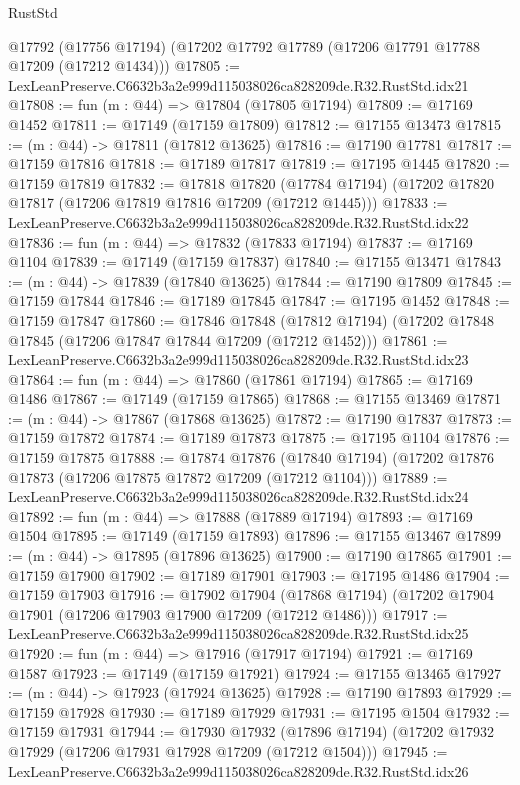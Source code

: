 \begin{lexlean}{RustStd}
\begin{coremodule}
    @17792
    (@17756 @17194)
    (@17202 @17792 @17789 (@17206 @17791 @17788 @17209 (@17212 @1434)))
@17805 := LexLeanPreserve.C6632b3a2e999d115038026ca828209de.R32.RustStd.idx21
@17808 := fun (m : @44) => @17804 (@17805 @17194)
@17809 := @17169 @1452
@17811 := @17149 (@17159 @17809)
@17812 := @17155 @13473
@17815 := (m : @44) -> @17811 (@17812 @13625)
@17816 := @17190 @17781
@17817 := @17159 @17816
@17818 := @17189 @17817
@17819 := @17195 @1445
@17820 := @17159 @17819
@17832 := @17818
    @17820
    (@17784 @17194)
    (@17202 @17820 @17817 (@17206 @17819 @17816 @17209 (@17212 @1445)))
@17833 := LexLeanPreserve.C6632b3a2e999d115038026ca828209de.R32.RustStd.idx22
@17836 := fun (m : @44) => @17832 (@17833 @17194)
@17837 := @17169 @1104
@17839 := @17149 (@17159 @17837)
@17840 := @17155 @13471
@17843 := (m : @44) -> @17839 (@17840 @13625)
@17844 := @17190 @17809
@17845 := @17159 @17844
@17846 := @17189 @17845
@17847 := @17195 @1452
@17848 := @17159 @17847
@17860 := @17846
    @17848
    (@17812 @17194)
    (@17202 @17848 @17845 (@17206 @17847 @17844 @17209 (@17212 @1452)))
@17861 := LexLeanPreserve.C6632b3a2e999d115038026ca828209de.R32.RustStd.idx23
@17864 := fun (m : @44) => @17860 (@17861 @17194)
@17865 := @17169 @1486
@17867 := @17149 (@17159 @17865)
@17868 := @17155 @13469
@17871 := (m : @44) -> @17867 (@17868 @13625)
@17872 := @17190 @17837
@17873 := @17159 @17872
@17874 := @17189 @17873
@17875 := @17195 @1104
@17876 := @17159 @17875
@17888 := @17874
    @17876
    (@17840 @17194)
    (@17202 @17876 @17873 (@17206 @17875 @17872 @17209 (@17212 @1104)))
@17889 := LexLeanPreserve.C6632b3a2e999d115038026ca828209de.R32.RustStd.idx24
@17892 := fun (m : @44) => @17888 (@17889 @17194)
@17893 := @17169 @1504
@17895 := @17149 (@17159 @17893)
@17896 := @17155 @13467
@17899 := (m : @44) -> @17895 (@17896 @13625)
@17900 := @17190 @17865
@17901 := @17159 @17900
@17902 := @17189 @17901
@17903 := @17195 @1486
@17904 := @17159 @17903
@17916 := @17902
    @17904
    (@17868 @17194)
    (@17202 @17904 @17901 (@17206 @17903 @17900 @17209 (@17212 @1486)))
@17917 := LexLeanPreserve.C6632b3a2e999d115038026ca828209de.R32.RustStd.idx25
@17920 := fun (m : @44) => @17916 (@17917 @17194)
@17921 := @17169 @1587
@17923 := @17149 (@17159 @17921)
@17924 := @17155 @13465
@17927 := (m : @44) -> @17923 (@17924 @13625)
@17928 := @17190 @17893
@17929 := @17159 @17928
@17930 := @17189 @17929
@17931 := @17195 @1504
@17932 := @17159 @17931
@17944 := @17930
    @17932
    (@17896 @17194)
    (@17202 @17932 @17929 (@17206 @17931 @17928 @17209 (@17212 @1504)))
@17945 := LexLeanPreserve.C6632b3a2e999d115038026ca828209de.R32.RustStd.idx26

\end{coremodule}
\end{lexlean}
